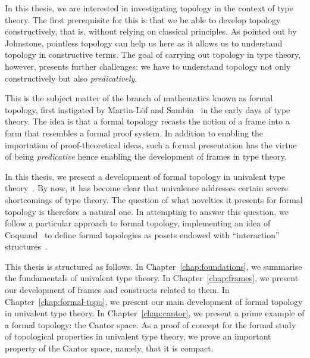 In this thesis, we are interested in investigating topology in the context of type theory.
The first prerequisite for this is that we be able to develop topology constructively,
that is, without relying on classical principles. As pointed out by Johnstone, pointless
topology can help us here as it allows us to understand topology in constructive terms.
The goal of carrying out topology in type theory, however, presents further challenges: we
have to understand topology not only constructively but also \emph{predicatively}.

This is the subject matter of the branch of mathematics known as formal topology, first
instigated by Martin-Löf and Sambin~\cite{int-formal-spaces} in the early days of type
theory. The idea is that a formal topology recasts the notion of a frame into a form that
resembles a formal proof system. In addition to enabling the importation of
proof-theoretical ideas, such a formal presentation has the virtue of being
\emph{predicative} hence enabling the development of frames in type theory.

In this thesis, we present a development of formal topology in univalent type
theory~\cite{hottbook}. By now, it has become clear that univalence addresses certain
severe shortcomings of type theory. The question of what novelties it presents for formal
topology is therefore a natural one. In attempting to answer this question, we follow a
particular approach to formal topology, implementing an idea of Coquand~\cite{coq-posets}
to define formal topologies as posets endowed with ``interaction''
structures~\cite{tree-sets, hancock-interaction-systems}.

This thesis is structured as follows. In Chapter~\ref{chap:foundations}, we summarise the
fundamentals of univalent type theory. In Chapter~\ref{chap:frames}, we present our
development of frames and constructs related to them. In Chapter~\ref{chap:formal-topo},
we present our main development of formal topology in univalent type theory. In
Chapter~\ref{chap:cantor}, we present a prime example of a formal topology: the Cantor
space. As a proof of concept for the formal study of topological properties in univalent
type theory, we prove an important property of the Cantor space, namely, that it is
compact.
